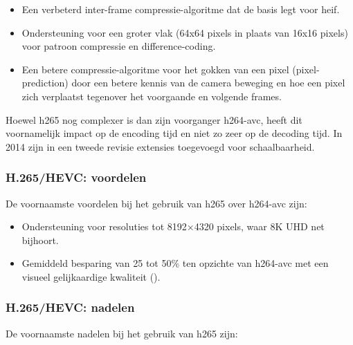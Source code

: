 \begin{itemize}
	
	\item Een verbeterd \gls{inter-frame} \gls{compressie-algoritme} dat de basis legt voor \gls{heif}.
	
	\item Ondersteuning voor een groter vlak (64x64 \glspl{pixel} in plaats van 16x16 \glspl{pixel}) voor patroon compressie en difference-coding.
	
	\item Een betere \gls{compressie-algoritme} voor het gokken van een \gls{pixel} (\gls{pixel-prediction}) door een betere kennis van de camera beweging en hoe een \gls{pixel} zich verplaatst tegenover het voorgaande en volgende \glspl{frame}.
	
\end{itemize}

Hoewel \gls{h265} nog complexer is dan zijn voorganger \gls{h264-avc}, heeft dit voornamelijk impact op de \gls{encoding} tijd en niet zo zeer op de \gls{decoding} tijd. In 2014 zijn in een tweede revisie extensies toegevoegd voor schaalbaarheid.

\subsubsection{H.265/HEVC: voordelen}
\label{sec:videocompressie-h265-voordelen}

De voornaamste voordelen bij het gebruik van \gls{h265} over \gls{h264-avc} zijn:

\begin{itemize}
	
	\item Ondersteuning voor resoluties tot 8192×4320 \glspl{pixel}, waar 8K UHD net bijhoort.
	
	\item Gemiddeld besparing van 25 tot 50\%  ten opzichte van \gls{h264-avc} met een visueel gelijkaardige kwaliteit (\cite{h262h264h265vergelijking}).
	
\end{itemize}

\subsubsection{H.265/HEVC: nadelen}
\label{sec:videocompressie-h265-nadelen}

De voornaamste nadelen bij het gebruik van \gls{h265} zijn:


